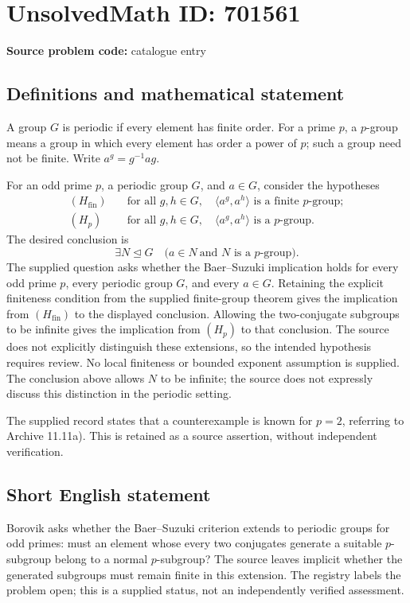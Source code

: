 \documentclass[11pt]{article}
\begin{document}
\section*{UnsolvedMath ID: 701561}
\textbf{Source problem code:} catalogue entry
\subsection{Definitions and mathematical statement}
A group \(G\) is periodic if every element has finite order. For a prime \(p\), a \(p\)-group means a group in which every element has order a power of \(p\); such a group need not be finite. Write \(a^g=g^{-1}ag\).

For an odd prime \(p\), a periodic group \(G\), and \(a\in G\), consider the hypotheses
\[
\begin{aligned}
(H_{\mathrm{fin}})\quad&\text{for all }g,h\in G,\quad \langle a^g,a^h\rangle\text{ is a finite }p\text{-group};\\
(H_p)\quad&\text{for all }g,h\in G,\quad \langle a^g,a^h\rangle\text{ is a }p\text{-group}.
\end{aligned}
\]
The desired conclusion is
\[
\exists N\trianglelefteq G\quad\bigl(a\in N\ \text{and }N\text{ is a }p\text{-group}\bigr).
\]
The supplied question asks whether the Baer--Suzuki implication holds for every odd prime \(p\), every periodic group \(G\), and every \(a\in G\). Retaining the explicit finiteness condition from the supplied finite-group theorem gives the implication from \((H_{\mathrm{fin}})\) to the displayed conclusion. Allowing the two-conjugate subgroups to be infinite gives the implication from \((H_p)\) to that conclusion. The source does not explicitly distinguish these extensions, so the intended hypothesis requires review. No local finiteness or bounded exponent assumption is supplied. The conclusion above allows \(N\) to be infinite; the source does not expressly discuss this distinction in the periodic setting.

The supplied record states that a counterexample is known for \(p=2\), referring to Archive 11.11a). This is retained as a source assertion, without independent verification.
\subsection{Short English statement}
Borovik asks whether the Baer--Suzuki criterion extends to periodic groups for odd primes: must an element whose every two conjugates generate a suitable \(p\)-subgroup belong to a normal \(p\)-subgroup? The source leaves implicit whether the generated subgroups must remain finite in this extension. The registry labels the problem open; this is a supplied status, not an independently verified assessment.
\end{document}
